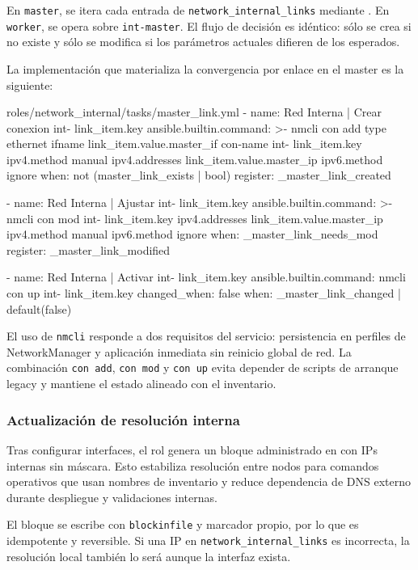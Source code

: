 En \texttt{master}, se itera cada entrada de \texttt{network\_internal\_links} mediante . En \texttt{worker}, se opera sobre \texttt{int-master}. El flujo de decisión es idéntico: sólo se crea si no existe y sólo se modifica si los parámetros actuales difieren de los esperados.

La implementación que materializa la convergencia por enlace en el master es la siguiente:

\begin{filecode}{roles/network_internal/tasks/master_link.yml}
- name: Red Interna | Crear conexion int-{{ link_item.key }}
  ansible.builtin.command: >-
    nmcli con add type ethernet ifname {{ link_item.value.master_if }} con-name int-{{ link_item.key }}
    ipv4.method manual ipv4.addresses {{ link_item.value.master_ip }} ipv6.method ignore
  when: not (master_link_exists | bool)
  register: _master_link_created

- name: Red Interna | Ajustar int-{{ link_item.key }}
  ansible.builtin.command: >-
    nmcli con mod int-{{ link_item.key }} ipv4.addresses {{ link_item.value.master_ip }} ipv4.method manual ipv6.method ignore
  when: _master_link_needs_mod
  register: _master_link_modified

- name: Red Interna | Activar int-{{ link_item.key }}
  ansible.builtin.command: nmcli con up int-{{ link_item.key }}
  changed_when: false
  when: _master_link_changed | default(false)
\end{filecode}

El uso de \texttt{nmcli} responde a dos requisitos del servicio: persistencia en perfiles de NetworkManager y aplicación inmediata sin reinicio global de red. La combinación \texttt{con add}, \texttt{con mod} y \texttt{con up} evita depender de scripts de arranque legacy y mantiene el estado alineado con el inventario.

\subsubsection{Actualización de resolución interna}
Tras configurar interfaces, el rol genera un bloque administrado en  con IPs internas sin máscara. Esto estabiliza resolución entre nodos para comandos operativos que usan nombres de inventario y reduce dependencia de DNS externo durante despliegue y validaciones internas.

El bloque se escribe con \texttt{blockinfile} y marcador propio, por lo que es idempotente y reversible. Si una IP en \texttt{network\_internal\_links} es incorrecta, la resolución local también lo será aunque la interfaz exista.

